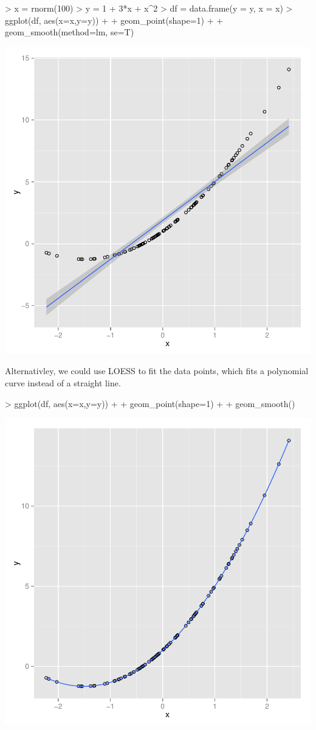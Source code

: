 \documentclass{article}
\begin{document}
\begin{Schunk}
\begin{Sinput}
> x = rnorm(100)
> y = 1 + 3*x + x^2
> df = data.frame(y = y, x = x)
> ggplot(df, aes(x=x,y=y)) + 
+ geom_point(shape=1) +
+ geom_smooth(method=lm, se=T)
\end{Sinput}
\end{Schunk}
\includegraphics{cookbook-035}

Alternativley, we could use LOESS to fit the data points,
which fits a polynomial curve instead of a straight line.

\begin{Schunk}
\begin{Sinput}
> ggplot(df, aes(x=x,y=y)) + 
+ geom_point(shape=1) +
+ geom_smooth()
\end{Sinput}
\end{Schunk}
\includegraphics{cookbook-036}
\end{document}
